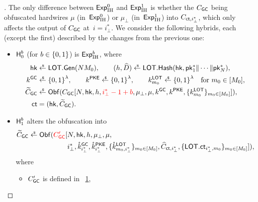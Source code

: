 \begin{figure}[t]

\label{fig:circuit-create-gc-proof}
\end{figure}

\begin{proof}[]
The only difference between $\ExpIH{0}$ and $\ExpIH{1}$ is whether the $C_\GC$ being obfuscated hardwires $\mu$ (in~$\ExpIH{0}$) or $\mu_\bot$ (in~$\ExpIH{1}$) into $C_{\ct,i_\bot^\ast}$, which only affects the output of $C_\GC$ at~${i=i_\bot^\ast}$.
We consider the following hybrids, each (except the first) described by the changes from the previous one:
\begin{itemize}
\item $\Hyb_0^b$ (for ${b\in{\{0,1\}}}$) is $\ExpIH{b}$, where
\begin{align*}
\hk&{}\draws\LOT.\Gen(NM_0),\qquad
(h,\widehat{D})\draws\LOT.\Hash(\hk,\pk^\ast_1\concat\cdots\concat\pk^\ast_N),\\
k^\GC&{}\draws\bit^\lambda,\qquad
k^\PKE\draws\bit^\lambda,\qquad
k^\LOT_{m_0}\draws\bit^\lambda\quad\textup{for }m_0\in[M_0],\\
\widetilde{C}_\GC&{}\draws\Obf(C_\GC[
N,\hk,h,{\color{red}i_\bot^\ast-1+b},\mu_\bot,\mu,k^\GC,k^\PKE,\{k^\LOT_{m_0}\}_{m_0\in[M_0]}
]),\\
\ct&{}=(\hk,\widetilde{C}_\GC).
\end{align*}
\item $\Hyb_1^b$ alters the obfuscation into
\begin{align*}
\WideNarrow{}{\hspace*{-1.5em}}
\widetilde{C}_\GC\draws\Obf({\color{red}C_\GC'}[
{}&
N,\hk,h,\mu_\bot,\mu,
\\ &
i_\bot^\ast,
\mathring{k}^\GC_{i_\bot^\ast},
\mathring{k}^\PKE_{i_\bot^\ast},
\{\mathring{k}^\LOT_{m_0,i_\bot^\ast}\}_{m_0\in[M_0]},
\widehat{C}_{\ct,i_\bot^\ast},
\{\LOT.\ct_{i_\bot^\ast,m_0}\}_{m_0\in[M_0]}
]),
\end{align*}
where
\begin{itemize}
\item $C_\GC'$ is defined in \Figure~\ref{fig:circuit-create-gc-proof},

\end{itemize}
\end{itemize}
\end{proof}
